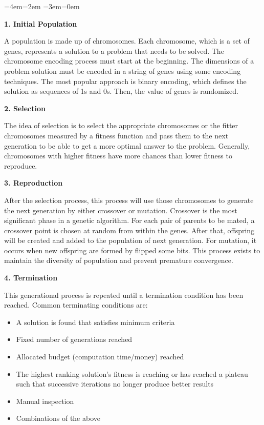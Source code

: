 \documentclass[12pt,oneside,openright,a4paper]{cpe-english-project}
\newenvironment{blockquote}{%
  \par%
  \medskip
  \leftskip=4em\rightskip=2em%
  \noindent\ignorespaces}{%
  \par\medskip}
\begin{document}
\begin{blockquote}\leftskip=3em\rightskip=0em

\textbf{1. Initial Population}\par

A population is made up of chromosomes. Each chromosome, which is a set of genes, represents a solution to a problem that needs to be solved. The chromosome encoding process must start at the beginning. The dimensions of a problem solution must be encoded in a string of genes using some encoding techniques. The most popular approach is binary encoding, which defines the solution as sequences of 1s and 0s. Then, the value of genes is randomized.

\textbf{2. Selection}\par

The idea of selection is to select the appropriate chromosomes or the fitter chromosomes measured by a fitness function and pass them to the next generation to be able to get a more optimal answer to the problem. Generally, chromosomes with higher fitness have more chances than lower fitness to reproduce.

\textbf{3. Reproduction}\par

After the selection process, this process will use those chromosomes to generate the next generation by either crossover or mutation. Crossover is the most significant phase in a genetic algorithm. For each pair of parents to be mated, a crossover point is chosen at random from within the genes. \cite{IntroductiontoGeneticAlgorithmsIncludingExampleCode} After that, offspring will be created and added to the population of next generation. For mutation, it occurs when new offspring are formed by flipped some bits. This process exists to maintain the diversity of population and prevent premature convergence.

\textbf{4. Termination}\cite{Geneticalgorithm}\par

This generational process is repeated until a termination condition has been reached. Common terminating conditions are:

\begin{itemize}\leftskip=5em
\item A solution is found that satisfies minimum criteria
\item Fixed number of generations reached
\item Allocated budget (computation time/money) reached
\item The highest ranking solution's fitness is reaching or has reached a plateau such that successive iterations no longer produce better results
\item Manual inspection
\item Combinations of the above
\end{itemize}

\end{blockquote}
\end{document}

